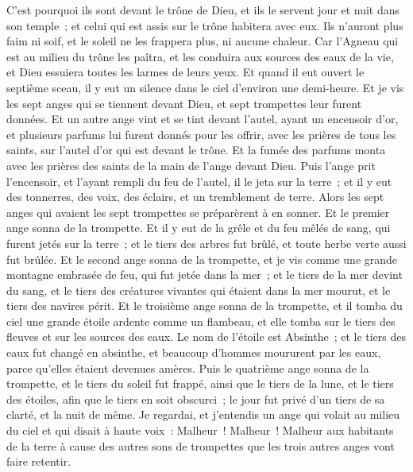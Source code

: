 \begin{multicols}{2}
C'est pourquoi ils sont devant le trône de Dieu, et ils le servent jour et nuit dans son temple~; et celui qui est assis sur le trône habitera avec eux.
Ils n'auront plus faim ni soif, et le soleil ne les frappera plus, ni aucune chaleur.
Car l'Agneau qui est au milieu du trône les paîtra, et les conduira aux sources des eaux de la vie, et Dieu essuiera toutes les larmes de leurs yeux.
\VerseOne{}Et quand il eut ouvert le septième sceau, il y eut un silence dans le ciel d'environ une demi-heure.
Et je vis les sept anges qui se tiennent devant Dieu, et sept trompettes leur furent données.
Et un autre ange vint et se tint devant l'autel, ayant un encensoir d'or, et plusieurs parfums lui furent donnés pour les offrir, avec les prières de tous les saints, sur l'autel d'or qui est devant le trône.
Et la fumée des parfums monta avec les prières des saints de la main de l'ange devant Dieu.
Puis l'ange prit l'encensoir, et l'ayant rempli du feu de l'autel, il le jeta sur la terre~; et il y eut des tonnerres, des voix, des éclairs, et un tremblement de terre.
Alors les sept anges qui avaient les sept trompettes se préparèrent à en sonner.
Et le premier ange sonna de la trompette. Et il y eut de la grêle et du feu mêlés de sang, qui furent jetés sur la terre~; et le tiers des arbres fut brûlé, et toute herbe verte aussi fut brûlée.
Et le second ange sonna de la trompette, et je vis comme une grande montagne embrasée de feu, qui fut jetée dans la mer~; et le tiers de la mer devint du sang,
et le tiers des créatures vivantes qui étaient dans la mer mourut, et le tiers des navires périt.
Et le troisième ange sonna de la trompette, et il tomba du ciel une grande étoile ardente comme un flambeau, et elle tomba sur le tiers des fleuves et sur les sources des eaux.
Le nom de l'étoile est Absinthe~; et le tiers des eaux fut changé en absinthe, et beaucoup d'hommes moururent par les eaux, parce qu'elles étaient devenues amères.
Puis le quatrième ange sonna de la trompette, et le tiers du soleil fut frappé, ainsi que le tiers de la lune, et le tiers des étoiles, afin que le tiers en soit obscurci~; le jour fut privé d'un tiers de sa clarté, et la nuit de même.
Je regardai, et j'entendis un ange qui volait au milieu du ciel et qui disait à haute voix~: Malheur~! Malheur~! Malheur aux habitants de la terre à cause des autres sons de trompettes que les trois autres anges vont faire retentir.

\end{multicols}
